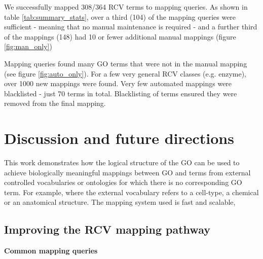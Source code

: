 \documentclass[runningheads,a4paper]{llncs}
\begin{document}
{{\begin{table}
%
 \end{table}
 
We successfully mapped 308/364 RCV terms to mapping queries.  As shown in table \ref{tab:summary_stats}, over a third (104) of the mapping queries were sufficient - meaning that no manual maintenance is required - and a further third of the mappings (148) had 10 or fewer additional manual mappings (figure \ref{fig:man_only})

Mapping queries found many \ac{GO} terms that were not in the manual mapping (see figure \ref{fig:auto_only}).  For a few very general RCV classes (e.g. enzyme), over 1000 new mappings were found. Very few automated mappings were blacklisted - just 70 terms in total.  Blacklisting of terms ensured they were removed from the final mapping.


\section{Discussion and future directions}

This work demonstrates how the logical structure of the \ac{GO} can be used to achieve biologically meaningful mappings between \ac{GO} and terms from external controlled vocabularies or ontologies for which there is no corresponding \ac{GO} term.  For example, where the external vocabulary refers to a cell-type, a chemical or an anatomical structure.  The mapping system used is fast and scalable,  

\subsection{Improving the RCV mapping pathway}


\begin{table}
\caption{\textbf{Common mapping queries}}
\label{mapping_patterns}


\end{table}}}
\end{document}
